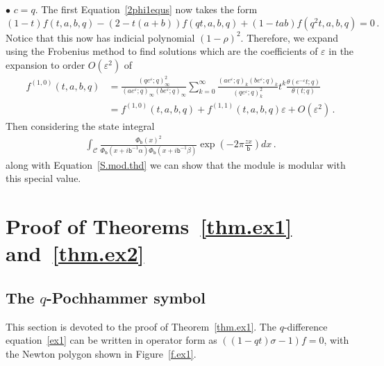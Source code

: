 \documentclass[12pt,reqno]{amsart}
\theoremstyle{definition}
\def\BR{\mathbbm R}
\def\calC{\mathcal C}
\def\tq{\tilde{q}}
\def\ve{\varepsilon}
\def\be{\begin{equation}}
\def\ee{\end{equation}}
\def\sfb{\mathsf{b}}
\def\e{\bold e}
\def\sfb{\mathsf{b}}
\begin{document}
\noindent
$\bullet \,\, c=q$. 
The first Equation~\eqref{2phi1equs} now takes the form
\be
    (1-t)f(t,a,b,q)-(2-t(a+b))f(qt,a,b,q)+(1-tab)f(q^2t,a,b,q)=0\,.
\ee
Notice that this now has indicial polynomial $(1-\rho)^2$. Therefore, we expand
using the Frobenius method to find solutions which are the coefficients of $\ve$
in the expansion to order $O(\ve^2)$ of 
\be
\begin{aligned}
  f^{(1,0)}(t,a,b,q)&=\frac{(qe^{\ve};q)_{\infty}^{2}}{
    (ae^{\ve};q)_{\infty}(be^{\ve};q)_{\infty}}\sum_{k=0}^{\infty}
  \frac{(ae^{\ve};q)_{k}(be^{\ve};q)_{k}}{(qe^{\ve};q)_{k}^{2}}t^{k}
  \frac{\theta(e^{-\ve}t;q)}{\theta(t;q)}\\
  &=f^{(1,0)}(t,a,b,q)+f^{(1,1)}(t,a,b,q)\ve+O(\ve^2)\,.
\end{aligned}
\ee
Then considering the state integral
\be
\begin{aligned}
\int_{\calC}
\frac{\Phi_{\sfb}(x)^2}
{\Phi_{\sfb}(x+i\sfb^{-1}\alpha)\Phi_{\sfb}(x+i\sfb^{-1}\beta)}
\exp\left(-2\pi\frac{zx}{\sfb}\right)
dx \,.
\end{aligned}
\ee
along with Equation~\eqref{S.mod.thd} we can show that the module is modular with
this special value.


\section{Proof of Theorems~\ref{thm.ex1} and~\ref{thm.ex2}}
\label{sec.thm12}

\subsection{The $q$-Pochhammer symbol}
\label{sub.ex1}

This section is devoted to the proof of Theorem~\ref{thm.ex1}. 
The $q$-difference equation~\eqref{ex1} can be written in operator form
as $((1-qt)\sigma-1)f=0$, with the Newton polygon shown in Figure~\ref{f.ex1}.
\end{document}
